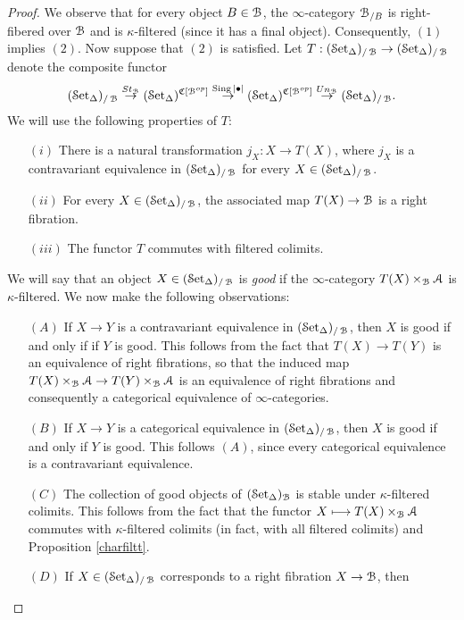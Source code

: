 \begin{proof}
We observe that for every object $B \in \operatorname{\mathcal{B}}$, the $\infty$-category $\operatorname{\mathcal{B}}_{/B}$ is right-fibered
over $\operatorname{\mathcal{B}}$ and is $\kappa$-filtered (since it has a final object). Consequently, $(1)$ implies $(2)$. Now suppose that $(2)$ is satisfied. Let $T: (\operatorname{\mathcal{S}et_{\Delta}})_{/\operatorname{\mathcal{B}}} \rightarrow (\operatorname{\mathcal{S}et_{\Delta}})_{/\operatorname{\mathcal{B}}}$
denote the composite functor
$$ (\operatorname{\mathcal{S}et_{\Delta}})_{/\operatorname{\mathcal{B}}} \stackrel{St_{\operatorname{\mathcal{B}}}}{\rightarrow} (\operatorname{\mathcal{S}et_{\Delta}})^{\operatorname{\mathfrak{C}}[\operatorname{\mathcal{B}}^{op}]}
\stackrel{\operatorname{Sing} |\bullet|}{\rightarrow} (\operatorname{\mathcal{S}et_{\Delta}})^{\operatorname{\mathfrak{C}}[\operatorname{\mathcal{B}}^{op}]} \stackrel{Un_{\operatorname{\mathcal{B}}}}{\rightarrow} (\operatorname{\mathcal{S}et_{\Delta}})_{/\operatorname{\mathcal{B}}}.$$
We will use the following properties of $T$:
\begin{itemize}
\item[$(i)$] There is a natural transformation $j_{X}: X \rightarrow T(X)$, where $j_{X}$ is
a contravariant equivalence in $(\operatorname{\mathcal{S}et_{\Delta}})_{/\operatorname{\mathcal{B}}}$ for every $X \in (\operatorname{\mathcal{S}et_{\Delta}})_{/\operatorname{\mathcal{B}}}$.
\item[$(ii)$] For every $X \in (\operatorname{\mathcal{S}et_{\Delta}})_{/\operatorname{\mathcal{B}}}$, the associated map $T(X) \rightarrow \operatorname{\mathcal{B}}$ is
a right fibration.
\item[$(iii)$] The functor $T$ commutes with filtered colimits.
\end{itemize}
We will say that an object $X \in (\operatorname{\mathcal{S}et_{\Delta}})_{/\operatorname{\mathcal{B}}}$ is {\it good} if the $\infty$-category
$T(X) \times_{\operatorname{\mathcal{B}}} \operatorname{\mathcal{A}}$ is $\kappa$-filtered. We now make the following observations:
\begin{itemize}
\item[$(A)$] If $X \rightarrow Y$ is a contravariant equivalence in $(\operatorname{\mathcal{S}et_{\Delta}})_{/\operatorname{\mathcal{B}}}$, then
$X$ is good if and only if if $Y$ is good. This follows from the fact that $T(X) \rightarrow T(Y)$
is an equivalence of right fibrations, so that the induced map $T(X) \times_{\operatorname{\mathcal{B}}} \operatorname{\mathcal{A}}
\rightarrow T(Y) \times_{\operatorname{\mathcal{B}}} \operatorname{\mathcal{A}}$ is an equivalence of right fibrations and consequently a categorical equivalence of $\infty$-categories.
\item[$(B)$] If $X \rightarrow Y$ is a categorical equivalence in $(\operatorname{\mathcal{S}et_{\Delta}})_{/\operatorname{\mathcal{B}}}$, then
$X$ is good if and only if $Y$ is good. This follows $(A)$, since every
categorical equivalence is a contravariant equivalence.
\item[$(C)$] The collection of good objects of $(\operatorname{\mathcal{S}et_{\Delta}})_{\operatorname{\mathcal{B}}}$ is stable under $\kappa$-filtered colimits. This follows from the fact that the functor $X \longmapsto T(X) \times_{\operatorname{\mathcal{B}}} \operatorname{\mathcal{A}}$ commutes with $\kappa$-filtered colimits (in fact, with all filtered colimits) and Proposition \ref{charfiltt}.
\item[$(D)$] If $X \in (\operatorname{\mathcal{S}et_{\Delta}})_{/\operatorname{\mathcal{B}}}$ corresponds to a right fibration $X \rightarrow \operatorname{\mathcal{B}}$, then

\end{itemize}
\end{proof}
